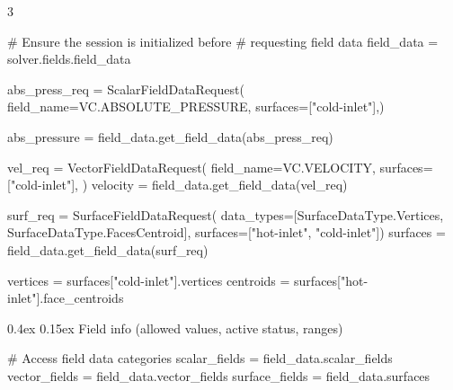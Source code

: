 \documentclass[
  9pt,
  landscape]{article}
\makeatletter
\newenvironment{Shaded}{\begin{snugshade}}{\end{snugshade}}
\newcommand{\CommentTok}[1]{\textcolor[rgb]{0.37,0.37,0.37}{#1}}
\newcommand{\NormalTok}[1]{\textcolor[rgb]{0.00,0.23,0.31}{#1}}
\newcommand{\OperatorTok}[1]{\textcolor[rgb]{0.37,0.37,0.37}{#1}}
\newcommand{\StringTok}[1]{\textcolor[rgb]{0.13,0.47,0.30}{#1}}
\renewcommand{\subsection}{\@startsection{subsection}{2}{0mm}%
    {0.4ex}%
    {0.15ex}%
  {\normalfont\small\bfseries\color{black}}}
\renewenvironment{Shaded}{\begin{snugshade}}{\end{snugshade}}
\makeatother
\begin{document}
\begin{multicols}{3}
\begin{Shaded}
\begin{Highlighting}[]
\CommentTok{\# Ensure the session is initialized before}
\CommentTok{\# requesting field data}
\NormalTok{field\_data }\OperatorTok{=}\NormalTok{ solver.fields.field\_data}

\NormalTok{abs\_press\_req }\OperatorTok{=}\NormalTok{ ScalarFieldDataRequest(}
\NormalTok{    field\_name}\OperatorTok{=}\NormalTok{VC.ABSOLUTE\_PRESSURE,}
\NormalTok{    surfaces}\OperatorTok{=}\NormalTok{[}\StringTok{"cold{-}inlet"}\NormalTok{],)}
    
\NormalTok{abs\_pressure }\OperatorTok{=}\NormalTok{ field\_data.get\_field\_data(abs\_press\_req)}

\NormalTok{vel\_req }\OperatorTok{=}\NormalTok{ VectorFieldDataRequest(}
\NormalTok{    field\_name}\OperatorTok{=}\NormalTok{VC.VELOCITY,}
\NormalTok{    surfaces}\OperatorTok{=}\NormalTok{[}\StringTok{"cold{-}inlet"}\NormalTok{],}
\NormalTok{    )}
\NormalTok{velocity }\OperatorTok{=}\NormalTok{ field\_data.get\_field\_data(vel\_req)}

\NormalTok{surf\_req }\OperatorTok{=}\NormalTok{ SurfaceFieldDataRequest(                                      }
\NormalTok{    data\_types}\OperatorTok{=}\NormalTok{[SurfaceDataType.Vertices, }
\NormalTok{                SurfaceDataType.FacesCentroid],}
\NormalTok{                surfaces}\OperatorTok{=}\NormalTok{[}\StringTok{"hot{-}inlet"}\NormalTok{, }\StringTok{"cold{-}inlet"}\NormalTok{])}
\NormalTok{surfaces }\OperatorTok{=}\NormalTok{ field\_data.get\_field\_data(surf\_req)}

\NormalTok{vertices }\OperatorTok{=}\NormalTok{ surfaces[}\StringTok{"cold{-}inlet"}\NormalTok{].vertices}
\NormalTok{centroids }\OperatorTok{=}\NormalTok{ surfaces[}\StringTok{"hot{-}inlet"}\NormalTok{].face\_centroids}
\end{Highlighting}
\end{Shaded}

\subsection{Field info (allowed values, active status,
ranges)}\label{field-info-allowed-values-active-status-ranges}

\begin{Shaded}
\begin{Highlighting}[]
\CommentTok{\# Access field data categories}
\NormalTok{scalar\_fields }\OperatorTok{=}\NormalTok{ field\_data.scalar\_fields}
\NormalTok{vector\_fields }\OperatorTok{=}\NormalTok{ field\_data.vector\_fields}
\NormalTok{surface\_fields }\OperatorTok{=}\NormalTok{ field\_data.surfaces}


\end{Highlighting}
\end{Shaded}
\end{multicols}
\end{document}
